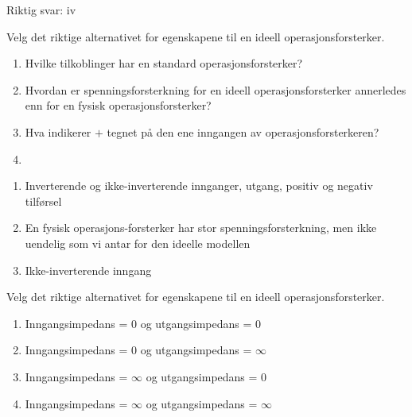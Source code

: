 \begin{solution}[name=Løsningsforslag oppgave]
	Riktig svar: iv
\end{solution}
\vspace{0.5cm} %

\begin{question}[name=Oppgave, topic=operasjonsforsterker]
	Velg det riktige alternativet for egenskapene til en ideell operasjonsforsterker.

	\begin{enumerate}[label=\roman*)]
		\item Hvilke tilkoblinger har en standard operasjonsforsterker?
		\item Hvordan er spenningsforsterkning for en ideell operasjonsforsterker annerledes enn for en fysisk operasjonsforsterker?
		\item Hva indikerer $+$ tegnet på den ene inngangen av operasjonsforsterkeren?
		\item
	\end{enumerate}
\end{question}

\vspace{0.5cm} %

\begin{solution}[name=Løsningsforslag oppgave]

	\begin{enumerate}[label=\roman*)]
		\item Inverterende og ikke-inverterende innganger, utgang, positiv og negativ tilførsel
		\item En fysisk operasjons-forsterker har stor spenningsforsterkning, men ikke uendelig som vi antar for den ideelle modellen
		\item Ikke-inverterende inngang
	\end{enumerate}

\end{solution}

\vspace{0.5cm} %
\begin{question}[name=Oppgave, topic=operasjonsforsterker]
Velg det riktige alternativet for egenskapene til en ideell operasjonsforsterker.

	\begin{enumerate}[label=\roman*)]
	\item Inngangsimpedans = 0 og utgangsimpedans = 0
	\item Inngangsimpedans = 0 og utgangsimpedans = $\infty$
	\item Inngangsimpedans = $\infty$ og utgangsimpedans = 0
	\item Inngangsimpedans = $\infty$ og utgangsimpedans = $\infty$
\end{enumerate}
\end{question}

